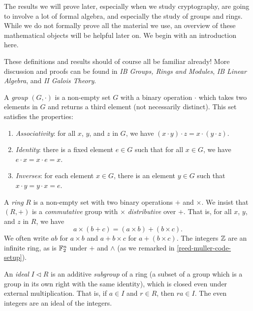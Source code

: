 \documentclass{article}
\begin{document}
The results we will prove later, especially when we study cryptography, are going to involve a lot of formal algebra, and especially the study of groups and rings. While we do not formally prove all the material we use, an overview of these mathematical objects will be helpful later on. We begin with an introduction here.

\begin{note}
	These definitions and results should of course all be familiar already! More discussion and proofs can be found in \textit{IB Groups, Rings and Modules}, \textit{IB Linear Algebra}, and \textit{II Galois Theory}.
\end{note}

\begin{definition}[Group]
    A \textit{group} $(G, \cdot)$ is a non-empty set $G$ with a binary operation $\cdot$ which takes two elements in $G$ and returns a third element (not necessarily distinct). This set satisfies the properties:
    \begin{enumerate}
	    \item \textit{Associativity}: for all $x$, $y$, and $z$ in $G$, we have $(x \cdot y) \cdot z = x \cdot (y \cdot z)$.
	    \item \textit{Identity}: there is a fixed element $e \in G$ such that for all $x \in G$, we have $e \cdot x = x \cdot e = x$.
	    \item \textit{Inverses}: for each element $x \in G$, there is an element $y \in G$ such that $x \cdot y = y \cdot x = e$.
	\end{enumerate}
\end{definition}

\begin{definition}[Ring]
    A \textit{ring} $R$ is a non-empty set with two binary operations $+$ and $\times$. We insist that $(R, +)$ is a \textit{commutative} group with $\times$ \textit{distributive} over $+$. That is, for all $x$, $y$, and $z$ in $R$, we have
    \[
	a \times (b + c) = (a \times b) + (b \times c).
	\]
	We often write $ab$ for $a \times b$ and $a + b \times c$ for $a + (b \times c)$. The integers $\mathbb{Z}$ are an infinite ring, as is $\mathbb{F}_2^n$ under $+$ and $\land$ (as we remarked in \ref{reed-muller-code-setup}).
\end{definition}

\begin{definition}[Ideal]
    An \textit{ideal} $I \triangleleft R$ is an additive \textit{subgroup} of a ring (a subset of a group which is a group in its own right with the same identity), which is closed even under external multiplication. That is, if $a \in I$ and $r \in R$, then $ra \in I$. The even integers are an ideal of the integers.
\end{definition}
\end{document}
